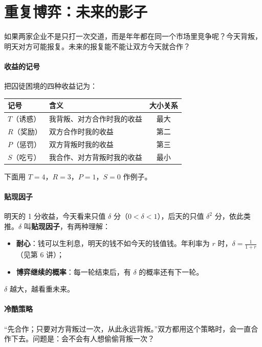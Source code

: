 \section{重复博弈：未来的影子}

如果两家企业不是只打一次交道，而是年年都在同一个市场里竞争呢？今天背叛，明天对方可能报复。未来的报复能不能让双方今天就合作？

\paragraph{收益的记号}
把囚徒困境的四种收益记为：
\begin{center}
\small
\begin{tabular}{llc}
  \toprule
  记号 & 含义 & 大小关系 \\
  \midrule
  $T$（诱惑） & 我背叛、对方合作时我的收益 & 最大 \\
  $R$（奖励） & 双方合作时我的收益 & 第二 \\
  $P$（惩罚） & 双方背叛时我的收益 & 第三 \\
  $S$（吃亏） & 我合作、对方背叛时我的收益 & 最小 \\
  \bottomrule
\end{tabular}
\end{center}
下面用 $T=4$，$R=3$，$P=1$，$S=0$ 作例子。

\paragraph{贴现因子}
明天的 1 分收益，今天看来只值 $\delta$ 分（$0<\delta<1$），后天的只值 $\delta^2$ 分，依此类推。$\delta$ 叫\textbf{贴现因子}，有两种理解：
\begin{itemize}
  \item \textbf{耐心}：钱可以生利息，明天的钱不如今天的钱值钱。年利率为 $r$ 时，$\delta=\frac1{1+r}$（见第 6 讲）；
  \item \textbf{博弈继续的概率}：每一轮结束后，有 $\delta$ 的概率还有下一轮。
\end{itemize}
$\delta$ 越大，越看重未来。

\paragraph{冷酷策略}
“先合作；只要对方背叛过一次，从此永远背叛。”双方都用这个策略时，会一直合作下去。问题是：会不会有人想偷偷背叛一次？

